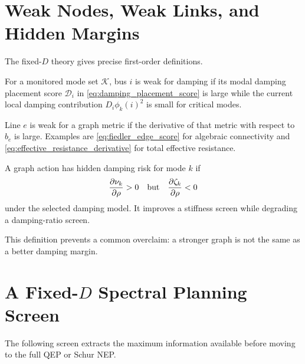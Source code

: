 \section{Weak Nodes, Weak Links, and Hidden Margins}

The fixed-\(D\) theory gives precise first-order definitions.

\begin{definition}
For a monitored mode set \(\mathcal K\), bus \(i\) is weak for damping if its
modal damping placement score \(\mathcal D_i\) in
\eqref{eq:damping_placement_score} is large while the current local damping
contribution \(D_i\phi_k(i)^2\) is small for critical modes.
\end{definition}

\begin{definition}
Line \(e\) is weak for a graph metric if the derivative of that metric with
respect to \(b_e\) is large. Examples are
\eqref{eq:fiedler_edge_score} for algebraic connectivity and
\eqref{eq:effective_resistance_derivative} for total effective resistance.
\end{definition}

\begin{definition}
A graph action has hidden damping risk for mode \(k\) if
\begin{equation}
  \frac{\partial \nu_k}{\partial\rho}>0
  \quad\hbox{but}\quad
  \frac{\partial \zeta_k}{\partial\rho}<0
  \label{eq:hidden_margin_definition}
\end{equation}
under the selected damping model. It improves a stiffness screen while
degrading a damping-ratio screen.
\end{definition}

This definition prevents a common overclaim: a stronger graph is not the same
as a better damping margin.

\section{A Fixed-\texorpdfstring{\(D\)}{D} Spectral Planning Screen}

The following screen extracts the maximum information available before moving
to the full QEP or Schur NEP.

